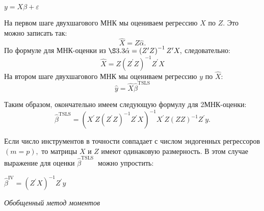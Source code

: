 \documentclass[a4paper,8pt]{article} %
\begin{document}
$y=X \beta+\varepsilon$


На первом шаге двухшагового МНК мы оцениваем регрессию $X$ по $Z .$ Это можно записать так:
$$
\hat{X}=Z \hat{\alpha} .
$$
По формуле для МНК-оценки из $\S 3.3 \hat{\alpha}=\left(Z^{\prime} Z\right)^{-1} Z^{\prime} X,$ следовательно:
$$
\hat{X}=Z\left(Z^{\prime} Z\right)^{-1} Z^{\prime} X
$$
На втором шаге двухшагового МНК мы оцениваем регрессию $y$ по $\hat{X}:$
$$
\hat{y}=\hat{X} \hat{\beta}^{\mathrm{TSLS}}
$$

Таким образом, окончательно имеем следующую формулу для 2МНК-оценки:
$$
\hat{\beta}^{\mathrm{TSLS}}=\left(X^{\prime} Z\left(Z^{\prime} Z\right)^{-1} Z^{\prime} X\right)^{-1} X^{\prime} Z(Z Z)^{-1} Z^{\prime} y .
$$


Если число инструментов в точности совпадает с числом эндогенных регрессоров $(m=p),$ то матрицы $X$ и $Z$ имеют одинаковую размерность. В этом случае выражение для оценки $\hat{\beta}^{\text {TSLS }}$ можно упростить:

$\hat{\beta}^{\mathrm{IV}}=\left(Z^{\prime} X\right)^{-1} Z^{\prime} y$


%
%
%
%
%
%
%
%


\textit{Обобщенный метод моментов}
\end{document}
